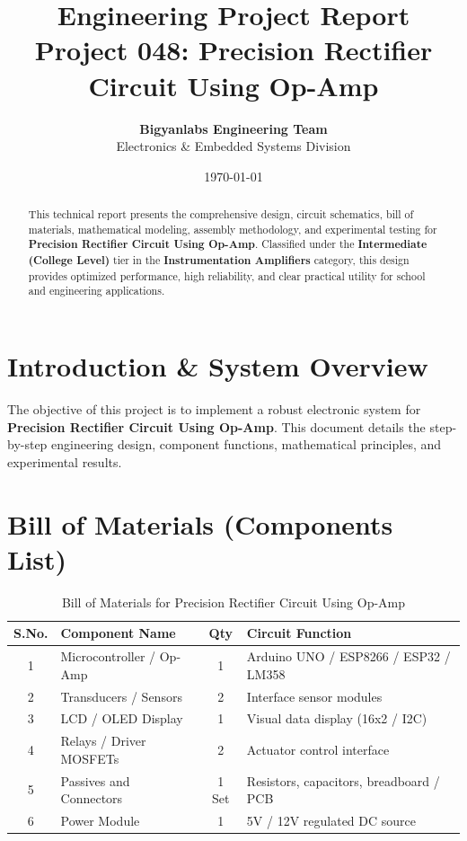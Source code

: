 \documentclass[11pt,a4paper]{article}
\title{\textbf{\Huge Engineering Project Report}\\[0.5em] \Large Project 048: Precision Rectifier Circuit Using Op-Amp}
\author{\textbf{Bigyanlabs Engineering Team}\\ Electronics \& Embedded Systems Division}
\date{\today}
\begin{document}
\maketitle
\thispagestyle{empty}

\begin{abstract}
This technical report presents the comprehensive design, circuit schematics, bill of materials, mathematical modeling, assembly methodology, and experimental testing for \textbf{Precision Rectifier Circuit Using Op-Amp}. Classified under the \textbf{Intermediate (College Level)} tier in the \textbf{Instrumentation Amplifiers} category, this design provides optimized performance, high reliability, and clear practical utility for school and engineering applications.
\end{abstract}

\newpage
\tableofcontents
\newpage

\section{Introduction \& System Overview}
The objective of this project is to implement a robust electronic system for \textbf{Precision Rectifier Circuit Using Op-Amp}. This document details the step-by-step engineering design, component functions, mathematical principles, and experimental results.

\section{Bill of Materials (Components List)}
\begin{table}[h!]
\centering
\caption{Bill of Materials for Precision Rectifier Circuit Using Op-Amp}
\vspace{0.5em}
\begin{tabular}{clcp{7cm}}
\toprule
\textbf{S.No.} & \textbf{Component Name} & \textbf{Qty} & \textbf{Circuit Function} \\
\midrule
1 & Microcontroller / Op-Amp & 1 & Arduino UNO / ESP8266 / ESP32 / LM358 \\
2 & Transducers / Sensors & 2 & Interface sensor modules \\
3 & LCD / OLED Display & 1 & Visual data display (16x2 / I2C) \\
4 & Relays / Driver MOSFETs & 2 & Actuator control interface \\
5 & Passives and Connectors & 1 Set & Resistors, capacitors, breadboard / PCB \\
6 & Power Module & 1 & 5V / 12V regulated DC source \\
\bottomrule
\end{tabular}
\end{table}
\end{document}
